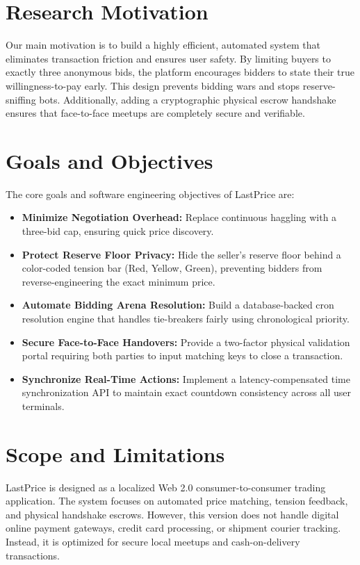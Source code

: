 \documentclass[12pt,a4paper,oneside]{report}
\begin{document}
\section{Research Motivation}
Our main motivation is to build a highly efficient, automated system that eliminates transaction friction and ensures user safety. By limiting buyers to exactly three anonymous bids, the platform encourages bidders to state their true willingness-to-pay early. This design prevents bidding wars and stops reserve-sniffing bots. Additionally, adding a cryptographic physical escrow handshake ensures that face-to-face meetups are completely secure and verifiable.

\section{Goals and Objectives}
The core goals and software engineering objectives of LastPrice are:
\begin{itemize}
    \item \textbf{Minimize Negotiation Overhead:} Replace continuous haggling with a three-bid cap, ensuring quick price discovery.
    \item \textbf{Protect Reserve Floor Privacy:} Hide the seller's reserve floor behind a color-coded tension bar (Red, Yellow, Green), preventing bidders from reverse-engineering the exact minimum price.
    \item \textbf{Automate Bidding Arena Resolution:} Build a database-backed cron resolution engine that handles tie-breakers fairly using chronological priority.
    \item \textbf{Secure Face-to-Face Handovers:} Provide a two-factor physical validation portal requiring both parties to input matching keys to close a transaction.
    \item \textbf{Synchronize Real-Time Actions:} Implement a latency-compensated time synchronization API to maintain exact countdown consistency across all user terminals.
\end{itemize}

\section{Scope and Limitations}
LastPrice is designed as a localized Web 2.0 consumer-to-consumer trading application. The system focuses on automated price matching, tension feedback, and physical handshake escrows. However, this version does not handle digital online payment gateways, credit card processing, or shipment courier tracking. Instead, it is optimized for secure local meetups and cash-on-delivery transactions.
\end{document}
